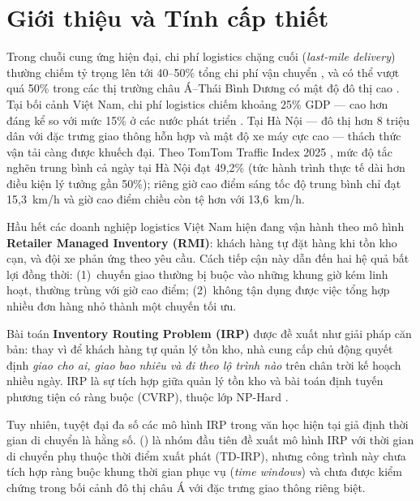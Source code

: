 \documentclass[12pt,a4paper]{article}
\newcommand{\boldterm}[1]{\textbf{\color{primary}#1}}
\newcommand{\citealias}[1]{\citeauthor{#1} (\citeyear{#1})}
\begin{document}
\newpage
\tableofcontents
\newpage

\section{Giới thiệu và Tính cấp thiết}

Trong chuỗi cung ứng hiện đại, chi phí logistics chặng cuối (\textit{last-mile delivery})
thường chiếm tỷ trọng lên tới 40--50\% tổng chi phí vận chuyển \citep{gevaers2011characterization},
và có thể vượt quá 50\% trong các thị trường châu Á--Thái Bình Dương có mật độ đô thị cao
\citep{fedex2024apac}. Tại bối cảnh Việt Nam, chi phí logistics chiếm khoảng 25\% GDP ---
cao hơn đáng kể so với mức 15\% ở các nước phát triển \citep{amr2022vietnam}.
Tại Hà Nội --- đô thị hơn 8 triệu dân với đặc trưng giao thông hỗn hợp và mật độ xe
máy cực cao --- thách thức vận tải càng được khuếch đại. Theo TomTom Traffic Index 2025
\citep{tomtom2025hanoi}, mức độ tắc nghẽn trung bình cả ngày tại Hà Nội đạt 49,2\%
(tức hành trình thực tế dài hơn điều kiện lý tưởng gần 50\%); riêng giờ cao điểm sáng
tốc độ trung bình chỉ đạt 15,3~km/h và giờ cao điểm chiều còn tệ hơn với 13,6~km/h.

Hầu hết các doanh nghiệp logistics Việt Nam hiện đang vận hành theo mô hình
\boldterm{Retailer Managed Inventory (RMI)}: khách hàng tự đặt hàng khi tồn kho cạn,
và đội xe phản ứng theo yêu cầu. Cách tiếp cận này dẫn đến hai hệ quả bất lợi đồng thời:
(1)~chuyến giao thường bị buộc vào những khung giờ kém linh hoạt, thường trùng với giờ
cao điểm; (2)~không tận dụng được việc tổng hợp nhiều đơn hàng nhỏ thành một chuyến
tối ưu.

Bài toán \boldterm{Inventory Routing Problem (IRP)} được đề xuất như giải pháp căn bản:
thay vì để khách hàng tự quản lý tồn kho, nhà cung cấp chủ động quyết định \textit{giao
cho ai, giao bao nhiêu và đi theo lộ trình nào} trên chân trời kế hoạch nhiều ngày.
IRP là sự tích hợp giữa quản lý tồn kho và bài toán định tuyến phương tiện có ràng buộc
(CVRP), thuộc lớp NP-Hard \citep{coelho2014thirty}.

Tuy nhiên, tuyệt đại đa số các mô hình IRP trong văn học hiện tại giả định thời gian
di chuyển là hằng số. \citealias{touzout2022assign} là nhóm đầu tiên đề xuất mô hình
IRP với thời gian di chuyển phụ thuộc thời điểm xuất phát (TD-IRP), nhưng công trình
này chưa tích hợp ràng buộc khung thời gian phục vụ (\textit{time windows}) và chưa
được kiểm chứng trong bối cảnh đô thị châu Á với đặc trưng giao thông riêng biệt.
\end{document}
